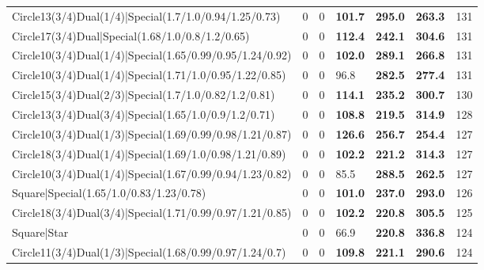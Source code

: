 \begin{tabular}{lrrlllr}
 Circle13(3/4)Dual(1/4)|Special(1.7/1.0/0.94/1.25/0.73)       &          0   &            0   & \textbf{101.7} & \textbf{295.0} & \textbf{263.3} &          131 \\
 Circle17(3/4)Dual|Special(1.68/1.0/0.8/1.2/0.65)             &          0   &            0   & \textbf{112.4} & \textbf{242.1} & \textbf{304.6} &          131 \\
 Circle10(3/4)Dual(1/4)|Special(1.65/0.99/0.95/1.24/0.92)     &          0   &            0   & \textbf{102.0} & \textbf{289.1} & \textbf{266.8} &          131 \\
 Circle10(3/4)Dual(1/4)|Special(1.71/1.0/0.95/1.22/0.85)      &          0   &            0   & 96.8           & \textbf{282.5} & \textbf{277.4} &          131 \\
 Circle15(3/4)Dual(2/3)|Special(1.7/1.0/0.82/1.2/0.81)        &          0   &            0   & \textbf{114.1} & \textbf{235.2} & \textbf{300.7} &          130 \\
 Circle13(3/4)Dual(3/4)|Special(1.65/1.0/0.9/1.2/0.71)        &          0   &            0   & \textbf{108.8} & \textbf{219.5} & \textbf{314.9} &          128 \\
 Circle10(3/4)Dual(1/3)|Special(1.69/0.99/0.98/1.21/0.87)     &          0   &            0   & \textbf{126.6} & \textbf{256.7} & \textbf{254.4} &          127 \\
 Circle18(3/4)Dual(1/4)|Special(1.69/1.0/0.98/1.21/0.89)      &          0   &            0   & \textbf{102.2} & \textbf{221.2} & \textbf{314.3} &          127 \\
 Circle10(3/4)Dual(1/4)|Special(1.67/0.99/0.94/1.23/0.82)     &          0   &            0   & 85.5           & \textbf{288.5} & \textbf{262.5} &          127 \\
 Square|Special(1.65/1.0/0.83/1.23/0.78)                      &          0   &            0   & \textbf{101.0} & \textbf{237.0} & \textbf{293.0} &          126 \\
 Circle18(3/4)Dual(3/4)|Special(1.71/0.99/0.97/1.21/0.85)     &          0   &            0   & \textbf{102.2} & \textbf{220.8} & \textbf{305.5} &          125 \\
 Square|Star                                                  &          0   &            0   & 66.9           & \textbf{220.8} & \textbf{336.8} &          124 \\
 Circle11(3/4)Dual(1/3)|Special(1.68/0.99/0.97/1.24/0.7)      &          0   &            0   & \textbf{109.8} & \textbf{221.1} & \textbf{290.6} &          124 \\

\end{tabular}
